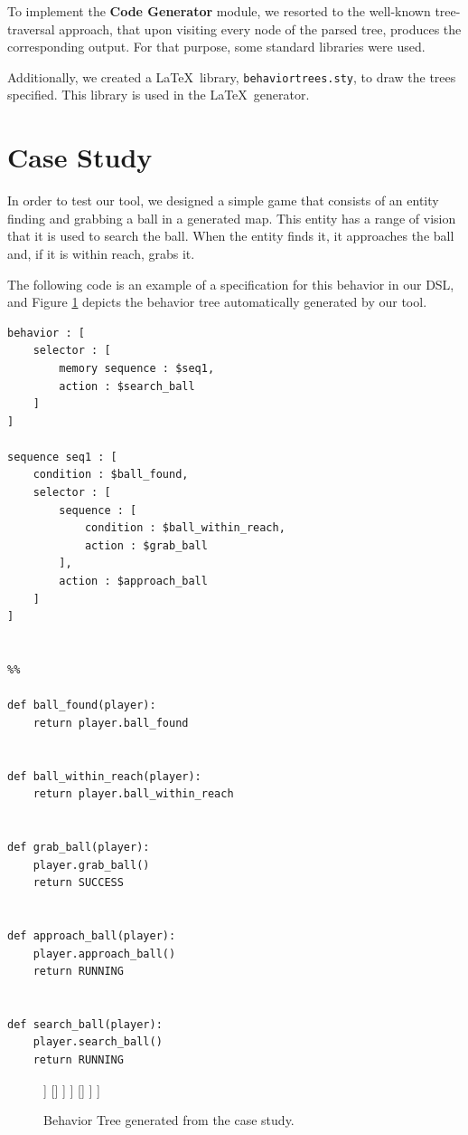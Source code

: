 \documentclass[a4paper,UKenglish,cleveref, autoref, thm-restate]{oasics-v2019}
\begin{document}
To implement the \textbf{Code Generator} module, we resorted to the well-known tree-traversal approach, that upon visiting every node of the parsed tree, produces the corresponding output.
For that purpose, some standard libraries were used.

Additionally, we created a \LaTeX\ library, \texttt{behaviortrees.sty}, to draw the trees specified. 
This library is used in the \LaTeX\ generator.

\section{Case Study}
In order to test our tool, we designed a simple game that consists of an entity finding and grabbing a ball in a generated map.
This entity has a range of vision that it is used to search the ball.
When the entity finds it, it approaches the ball and, if it is within reach, grabs it.

The following code is an example of a specification for this behavior in our DSL, and Figure \ref{fig:case_study_bt} depicts the behavior tree automatically generated by our tool.
\begin{lstlisting}
behavior : [
    selector : [
        memory sequence : $seq1,
        action : $search_ball
    ]
]

sequence seq1 : [
    condition : $ball_found,
    selector : [
        sequence : [
            condition : $ball_within_reach,
            action : $grab_ball
        ],
        action : $approach_ball
    ]
]


%%

def ball_found(player):
    return player.ball_found


def ball_within_reach(player):
    return player.ball_within_reach


def grab_ball(player):
    player.grab_ball()
    return SUCCESS


def approach_ball(player):
    player.approach_ball()
    return RUNNING


def search_ball(player):
    player.search_ball()
    return RUNNING
\end{lstlisting}

\begin{figure}
    \centering
    \begin{behavior}
        [\rootnode
            [\selector
                [\memorysequence
                    [\condition{ball found}]
                    [\selector
                        [\sequence
                            [\condition{ball within reach}]
                            [\action{grab ball}]
                        ]
                        []
                    ]
                ]
                []
            ]
        ]
    \end{behavior}
    \caption{Behavior Tree generated from the case study.}
    \label{fig:case_study_bt}
\end{figure}
\end{document}

